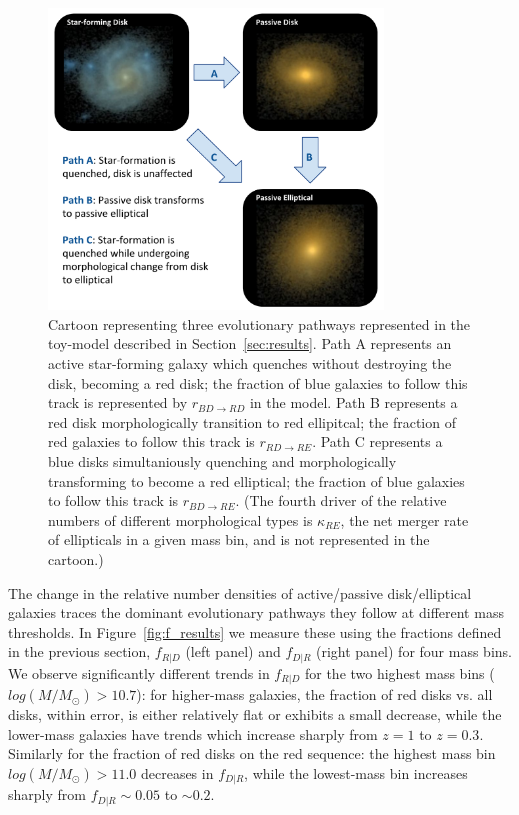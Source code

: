 \documentclass[useAMS,usenatbib]{mn2e}
\begin{document}
\begin{figure}
\centering
\includegraphics[width=3.5in]{figures/cartoon.pdf}
\caption{Cartoon representing three evolutionary pathways represented in the toy-model described in Section~\ref{sec:results}. Path A represents an active star-forming galaxy which quenches without destroying the disk, becoming a red disk; the fraction of blue galaxies to follow this track is represented by $r_{BD \rightarrow RD}$ in the model. Path B represents a red disk morphologically transition to red ellipitcal; the fraction of red galaxies to follow this track is $r_{RD \rightarrow RE}$. Path C represents a blue disks simultaniously quenching and morphologically transforming to become a red elliptical; the fraction of blue galaxies to follow this track is $r_{BD \rightarrow RE}$. (The fourth driver of the relative numbers of different morphological types is $\kappa_{RE}$, the net merger rate of ellipticals in a given mass bin, and is not represented in the cartoon.) }
\label{fig:cartoon}
\end{figure}
The change in the relative number densities of active/passive disk/elliptical galaxies traces the dominant evolutionary pathways they follow at different mass thresholds. In Figure~\ref{fig:f_results} we measure these using the fractions defined in the previous section, $f_{R|D}$ (left panel) and $f_{D|R}$ (right panel) for four mass bins. We observe significantly different trends in $f_{R|D}$ for the two highest mass bins ($log(M/M_{\odot})>10.7$): for higher-mass galaxies, the fraction of red disks vs. all disks, within error, is either relatively flat or exhibits a small decrease, while the lower-mass galaxies have trends which increase sharply from $z=1$ to $z=0.3$. Similarly for the fraction of red disks on the red sequence: the highest mass bin $log(M/M_{\odot})>11.0$ decreases in $f_{D|R}$, while the lowest-mass bin increases sharply from $f_{D|R}\sim0.05$ to $\sim 0.2$.  
\end{document}
